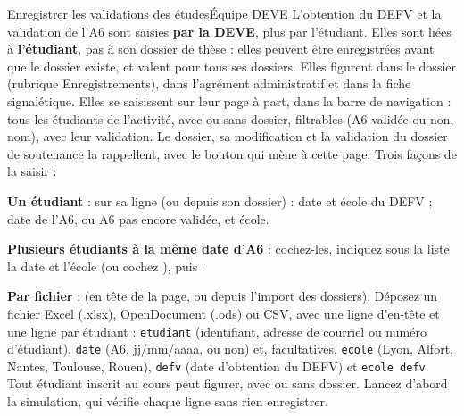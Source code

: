 \documentclass[11pt,a4paper]{article}
\begin{document}
\begin{procedure}{Enregistrer les validations des études}{Équipe DEVE}
L'obtention du DEFV et la validation de l'A6 sont saisies \textbf{par la DEVE},
plus par l'étudiant. Elles sont liées à \textbf{l'étudiant}, pas à son dossier
de thèse : elles peuvent être enregistrées avant que le dossier existe, et
valent pour tous ses dossiers. Elles figurent dans le dossier (rubrique
\og Enregistrements\fg{}), dans l'agrément administratif et dans la fiche
signalétique. Elles se saisissent sur leur page à part,  dans la barre de navigation : tous les
étudiants de l'activité, avec ou sans dossier, filtrables (A6 validée ou non,
nom), avec leur validation. Le dossier, sa modification et la validation du
dossier de soutenance la rappellent, avec le bouton  qui
mène à cette page. Trois façons de la saisir :
\begin{etapes}
  \item \textbf{Un étudiant} :  sur sa ligne (ou
         depuis son dossier) : date et école du DEFV ;
        date de l'A6, ou \og A6 pas encore validée\fg{}, et école.
  \item \textbf{Plusieurs étudiants à la même date d'A6} : cochez-les,
        indiquez sous la liste la date et l'école (ou cochez ), puis .
  \item \textbf{Par fichier} : 
        (en tête de la page, ou depuis l'import des dossiers).
        Déposez un fichier Excel (.xlsx), OpenDocument (.ods) ou CSV, avec une
        ligne d'en-tête et une ligne par étudiant : \texttt{etudiant}
        (identifiant, adresse de courriel ou numéro d'étudiant),
        \texttt{date} (A6, jj/mm/aaaa, ou \og non\fg{}) et, facultatives,
        \texttt{ecole} (Lyon, Alfort, Nantes, Toulouse, Rouen),
        \texttt{defv} (date d'obtention du DEFV) et \texttt{ecole defv}.
        Tout étudiant
        inscrit au cours peut figurer, avec ou sans dossier. Lancez d'abord
        la simulation, qui vérifie chaque ligne sans rien enregistrer.
\end{etapes}
\end{procedure}
\end{document}
